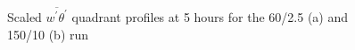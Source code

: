 \begin{figure}[htbp]
\begin{minipage}[b]{0.5\linewidth}
        \\
        \end{minipage}             
\quad
\begin{minipage}[b]{0.5\linewidth}
        \\
       \end{minipage}
        \caption{Scaled $\overline{w^{'} \theta^{'}}$ quadrant profiles at 5 hours for the 60/2.5 (a) and 150/10 (b) run}
        \label{fig:fluxqadprofs}
\end{figure}


